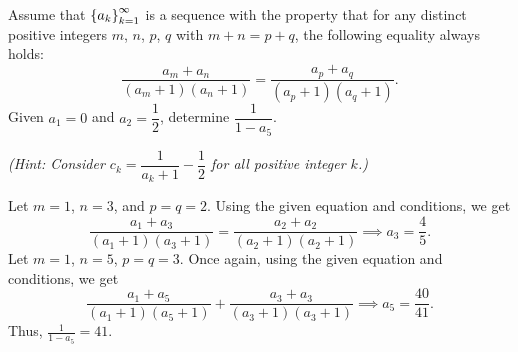 \begin{question}[41]\label{Q::2020-O-1-19}
    Assume that $\left\lbrace a_k \right\rbrace_{k=1}^\infty$ is a sequence with the property that for any distinct positive integers $m$, $n$, $p$, $q$ with $m + n = p + q$, the following equality always holds: \[\frac{a_m + a_n}{(a_m + 1)(a_n + 1)} = \frac{a_p + a_q}{(a_p + 1)(a_q + 1)}.\] Given $a_1 = 0$ and $a_2 = \dfrac12$, determine $\dfrac1{1 - a_5}$.

    \noindent\textit{(Hint: Consider $c_k = \dfrac{1}{a_k + 1} - \dfrac12$ for all positive integer $k$.)}
\end{question}
\begin{solution*}
    Let $m = 1$, $n = 3$, and $p = q = 2$. Using the given equation and conditions, we get \[\frac{a_1 + a_3}{(a_1 + 1)(a_3 + 1)} = \frac{a_2 + a_2}{(a_2 + 1)(a_2 + 1)} \implies a_3 = \frac45.\] Let $m = 1$, $n = 5$, $p = q = 3$. Once again, using the given equation and conditions, we get \[\frac{a_1 + a_5}{(a_1 + 1)(a_5 + 1)} + \frac{a_3 + a_3}{(a_3 + 1)(a_3 + 1)} \implies a_5 = \frac{40}{41}.\] Thus, $\frac{1}{1 - a_5} = 41$.
\end{solution*}

